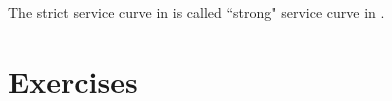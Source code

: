 The strict service curve in  is called ``strong"
service curve in \cite{CO96}.

\section{Exercises}
%
%
%







































